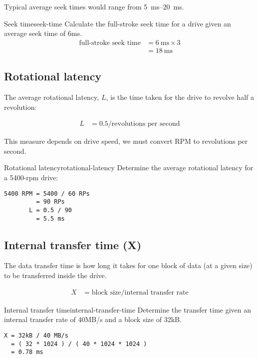\documentclass[slides]{pgnotes}
\begin{document}
Typical average seek times would range from \SIrange{5}{20}{\milli\second}.

\begin{example}{Seek time}{seek-time}
Calculate the full-stroke seek time for a drive given an average seek time of 6ms.
\tcblower
\begin{align}
  \mbox{full-stroke seek time} & = \SI{6}{\milli\second} \times 3 \\
                               & = \SI{18}{\milli\second}
\end{align}
\end{example}

\subsection{Rotational latency}
\label{sec:rotational-latency}

The average rotational latency, $L$, is the time taken for the drive to revolve half a revolution:

\begin{align}
  L & = 0.5 / \mbox{revolutions per second} \label{eq:rotational-latency}
\end{align}

This measure depends on drive speed, we must convert RPM to revolutions
per second.

\begin{example}{Rotational latency}{rotational-latency}
  Determine the average rotational latency for a 5400-rpm drive:
  \tcblower
\begin{verbatim}
5400 RPM = 5400 / 60 RPs
         = 90 RPs
       L = 0.5 / 90 
         = 5.5 ms
\end{verbatim}
\end{example}

\subsection{Internal transfer time (X)}\label{internal-transfer-time-x}

The data transfer time is how long it takes for one block of data (at a
given size) to be transferred inside the drive.

\begin{align}
  X & = \mbox{block size} / \mbox{internal transfer rate}
\end{align}


\begin{example}{Internal transfer time}{internal-transfer-time}
  Determine the transfer time given an internal transfer rate of 40MB/s and a block size of 32kB.
\tcblower
\begin{verbatim}
X = 32kB / 40 MB/s
  = ( 32 * 1024 ) / ( 40 * 1024 * 1024 )
  = 0.78 ms
\end{verbatim}
\end{example}
\end{document}
